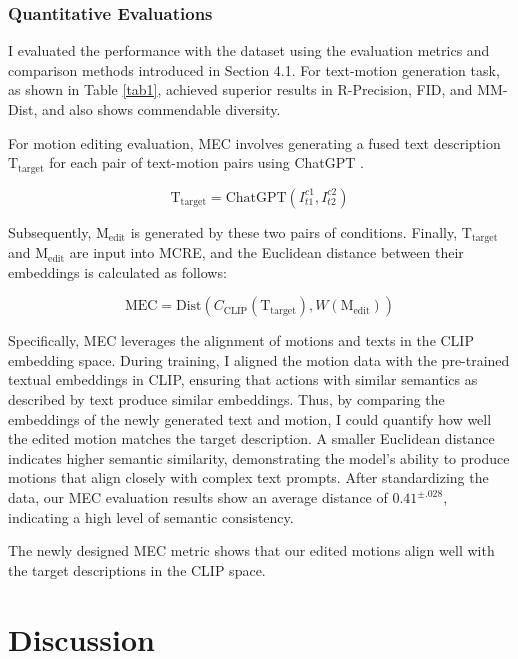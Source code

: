 \documentclass[a4paper, 12pt]{article}
\begin{document}
\subsubsection{Quantitative Evaluations}
I evaluated the performance with the dataset using the evaluation metrics and comparison methods introduced in Section 4.1. For text-motion generation task, as shown in Table \ref{tab1}, achieved superior results in R-Precision, FID, and MM-Dist, and also shows commendable diversity.

For motion editing evaluation, MEC involves generating a fused text description \( \text{T}_{\text{target}} \) for each pair of text-motion pairs using ChatGPT \cite{openai2024chatgpt}.

\begin{equation}
\text{T}_{\text{target}} = \text{ChatGPT}(I_{t1}^{c1}, I_{t2}^{c2})
\end{equation}

Subsequently, \( \text{M}_{\text{edit}} \) is generated by these two pairs of conditions. Finally, \( \text{T}_{\text{target}} \) and \( \text{M}_{\text{edit}} \) are input into MCRE, and the Euclidean distance between their embeddings is calculated as follows:

\begin{equation}
\text{MEC} = \text{Dist}\left(C_{\text{CLIP}}\left(\text{T}_{\text{target}}\right), W\left(\text{M}_{\text{edit}}\right)\right)
\end{equation}

Specifically, MEC leverages the alignment of motions and texts in the CLIP embedding space. During training, I aligned the motion data with the pre-trained textual embeddings in CLIP, ensuring that actions with similar semantics as described by text produce similar embeddings. Thus, by comparing the embeddings of the newly generated text and motion, I could quantify how well the edited motion matches the target description. A smaller Euclidean distance indicates higher semantic similarity, demonstrating the model's ability to produce motions that align closely with complex text prompts. After standardizing the data, our MEC evaluation results show an average distance of \(0.41^{\pm.028}\), indicating a high level of semantic consistency.

The newly designed MEC metric shows that our edited motions align well with the target descriptions in the CLIP space.


\newpage

\section{Discussion}
\end{document}
